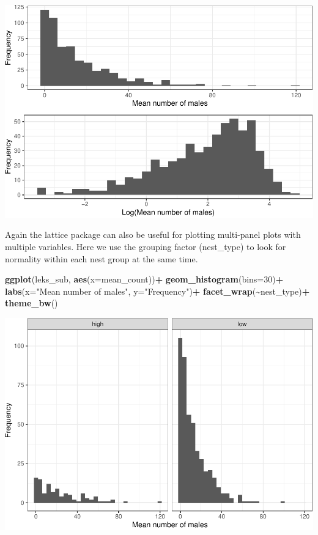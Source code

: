 \documentclass[
]{book}
\newenvironment{Shaded}{\begin{snugshade}}{\end{snugshade}}
\newcommand{\AttributeTok}[1]{\textcolor[rgb]{0.13,0.29,0.53}{#1}}
\newcommand{\DecValTok}[1]{\textcolor[rgb]{0.00,0.00,0.81}{#1}}
\newcommand{\FunctionTok}[1]{\textcolor[rgb]{0.13,0.29,0.53}{\textbf{#1}}}
\newcommand{\NormalTok}[1]{#1}
\newcommand{\SpecialCharTok}[1]{\textcolor[rgb]{0.81,0.36,0.00}{\textbf{#1}}}
\newcommand{\StringTok}[1]{\textcolor[rgb]{0.31,0.60,0.02}{#1}}
\begin{document}
\includegraphics{series_files/figure-latex/unnamed-chunk-35-1.pdf}

Again the lattice package can also be useful for plotting multi-panel plots with multiple variables. Here we use the grouping factor (nest\_type) to look for normality within each nest group at the same time.

\begin{Shaded}
\begin{Highlighting}[]
\FunctionTok{ggplot}\NormalTok{(leks\_sub, }\FunctionTok{aes}\NormalTok{(}\AttributeTok{x=}\NormalTok{mean\_count))}\SpecialCharTok{+}
    \FunctionTok{geom\_histogram}\NormalTok{(}\AttributeTok{bins=}\DecValTok{30}\NormalTok{)}\SpecialCharTok{+}
    \FunctionTok{labs}\NormalTok{(}\AttributeTok{x=}\StringTok{"Mean number of males"}\NormalTok{, }\AttributeTok{y=}\StringTok{"Frequency"}\NormalTok{)}\SpecialCharTok{+}
    \FunctionTok{facet\_wrap}\NormalTok{(}\SpecialCharTok{\textasciitilde{}}\NormalTok{nest\_type)}\SpecialCharTok{+}
    \FunctionTok{theme\_bw}\NormalTok{()}
\end{Highlighting}
\end{Shaded}

\includegraphics{series_files/figure-latex/unnamed-chunk-36-1.pdf}
\end{document}
